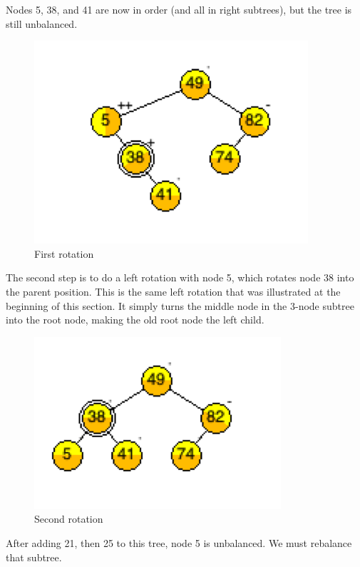 Nodes 5, 38, and 41 are now in order (and all in right subtrees), but the tree is still unbalanced.

\begin{figure}[H]
\centering
\includegraphics{pictures/tree5.png}
\caption{First rotation}
\label{fig:tree5}
\end{figure}

The second step is to do a left rotation with node 5, which rotates node 38 into the parent position.   This is the same left rotation that was illustrated at the beginning of this section.  It simply turns the middle node in the 3-node subtree into the root node, making the old root node the left child.

\begin{figure}[H]
\centering
\includegraphics{pictures/tree6.png}
\caption{Second rotation}
\label{fig:tree6}
\end{figure}

After adding 21, then 25 to this tree, node 5 is unbalanced.   We must rebalance that subtree.

